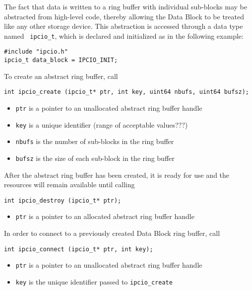 The fact that data is written to a ring buffer with individual
sub-blocks may be abstracted from high-level code, thereby allowing
the Data Block to be treated like any other storage device.  This
abstraction is accessed through a data type named {\tt
ipcio\_t}, which is declared and initialized as in the following
example:
\begin{verbatim}
#include "ipcio.h"
ipcio_t data_block = IPCIO_INIT;
\end{verbatim}
To create an abstract ring buffer, call
\begin{verbatim}
int ipcio_create (ipcio_t* ptr, int key, uint64 nbufs, uint64 bufsz);
\end{verbatim}
\vspace{-6mm}
\begin{itemize}
\item {\tt ptr} is a pointer to an unallocated abstract ring buffer handle
\vspace{-2mm}
\item {\tt key} is a unique identifier (range of acceptable values???)
\vspace{-2mm}
\item {\tt nbufs} is the number of sub-blocks in the ring buffer
\vspace{-2mm}
\item {\tt bufsz} is the size of each sub-block in the ring buffer
\end{itemize}
After the abstract ring buffer has been created, it is ready for use
and the resources will remain available until calling
\begin{verbatim}
int ipcio_destroy (ipcio_t* ptr);
\end{verbatim}
\vspace{-6mm}
\begin{itemize}
\item {\tt ptr} is a pointer to an allocated abstract ring buffer handle
\end{itemize}
In order to connect to a previously created Data Block ring buffer,
call
\begin{verbatim}
int ipcio_connect (ipcio_t* ptr, int key);
\end{verbatim}
\vspace{-6mm}
\begin{itemize}
\item {\tt ptr} is a pointer to an unallocated abstract ring buffer handle
\vspace{-2mm}
\item {\tt key} is the unique identifier passed to {\tt ipcio\_create}
\end{itemize}
